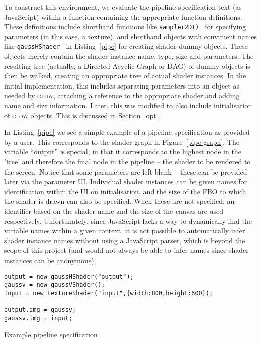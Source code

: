 \documentclass[12pt,twoside,notitlepage]{report}
\begin{document}
To construct this environment, we evaluate the pipeline specification text (as JavaScript) within a function containing the appropriate function definitions. These definitions include shorthand functions like {\tt sampler2D() } for specifying parameters (in this case, a texture), and shorthand objects with convinient names like {\tt gaussHShader } in Listing~\ref{pipe} for creating shader dummy objects. These objects merely contain the shader instance name, type, size and parameters. The resulting tree (actually, a Directed Acyclic Graph or DAG) of dummy objects is then be walked, creating an appropriate tree of actual shader instances. In the initial implementation, this includes separating parameters into an object as needed by \textsc{glow}, attaching a reference to the appropriate shader and adding name and size information. Later, this was modified to also include initialisation of \textsc{glow} objects. This is discussed in Section~\ref{opt}.

In Listing~\ref{pipe} we see a simple example of a pipeline specification as provided by a user. This corresponds to the shader graph in Figure~\ref{pipe-graph}. The variable ``output'' is special, in that it corresponds to the highest node in the 'tree' and therefore the final node in the pipeline -- the shader to be rendered to the screen. Notice that some parameters are left blank -- these can be provided later via the parameter UI. Individual shader instances can be given names for identification within the UI on initialisation, and the size of the FBO to which the shader is drawn can also be specified. When these are not specified, an identifier based on the shader name and the size of the canvas are used respectively. Unfortunately, since JavaScript lacks a way to dynamically find the variable names within a given context, it is not possible to automatically infer shader instance names without using a JavaScript parser, which is beyond the scope of this project (and would not always be able to infer names since shader instances can be anonymous).


\begin{listing}[H]
\begin{verbatim}
output = new gaussHShader("output");
gaussv = new gaussVShader();
input = new textureShader("input",{width:800,height:600});

output.img = gaussv;
gaussv.img = input;
\end{verbatim}
\caption{Example pipeline specification\label{pipe}}
\end{listing}
\end{document}
